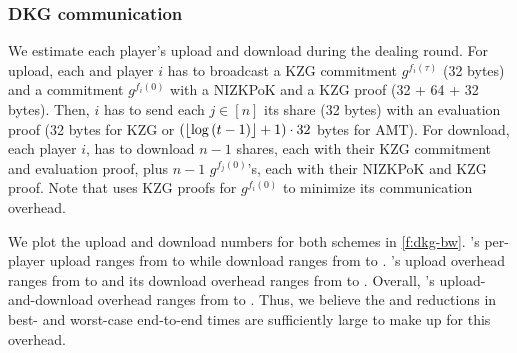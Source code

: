 \subsubsection{DKG communication}
\label{s:eval:dkg:communication}

We estimate each player's upload and download during the dealing round.
For upload, each \ejfdkg and \ourdkg player $i$ has to broadcast a KZG commitment $g^{f_i(\tau)}$ (32 bytes) and a commitment $g^{f_i(0)}$ with a NIZKPoK and a KZG proof (32 + 64 + 32 bytes).
Then, $i$ has to send each $j\in[n]$ its share (32 bytes) with an evaluation proof (32 bytes for KZG or $(\lfloor\log{(t-1)}\rfloor + 1) \cdot 32$ bytes for AMT).
For download, each player $i$, has to download $n-1$ shares, each with their KZG commitment and evaluation proof, plus $n-1$ $g^{f_j(0)}$'s, each with their NIZKPoK and KZG proof.
Note that \ourdkg uses KZG proofs for $g^{f_i(0)}$ to minimize its communication overhead.

We plot the upload and download numbers for both schemes in \cref{f:dkg-bw}.
\ejfdkg's per-player upload ranges from  to  while download ranges from  to .
\ourvss's upload overhead ranges from  to  and its download overhead ranges from  to .
Overall, \ourvss's upload-and-download overhead ranges from  to .
Thus, we believe the  and  reductions in best- and worst-case end-to-end times are sufficiently large to make up for this overhead.